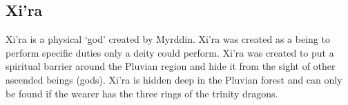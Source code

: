 \subsection{Xi'ra}

Xi'ra is a physical `god' created by Myrddin. Xi'ra was created as a being to perform specific duties only a deity could perform. Xi'ra was created to put a spiritual barrier around the Pluvian region and hide it from the sight of other ascended beings (gods). Xi'ra is hidden deep in the Pluvian forest and can only be found if the wearer has the three rings of the trinity dragons.




